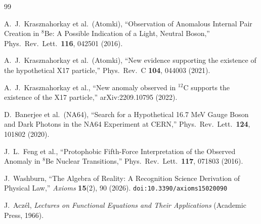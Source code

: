 \documentclass[12pt,a4paper]{article}
\theoremstyle{definition}
\theoremstyle{remark}
\begin{document}
\begin{thebibliography}{99}

A.~J.~Krasznahorkay et al.\ (Atomki),
``Observation of Anomalous Internal Pair Creation in ${}^8$Be:
A Possible Indication of a Light, Neutral Boson,''
Phys.\ Rev.\ Lett.\ \textbf{116}, 042501 (2016).

A.~J.~Krasznahorkay et al.\ (Atomki),
``New evidence supporting the existence of the hypothetical X17
particle,''
Phys.\ Rev.\ C \textbf{104}, 044003 (2021).

A.~J.~Krasznahorkay et al.,
``New anomaly observed in ${}^{12}$C supports the existence of the X17
particle,''
arXiv:2209.10795 (2022).

D.~Banerjee et al.\ (NA64),
``Search for a Hypothetical 16.7 MeV Gauge Boson and Dark Photons in
the NA64 Experiment at CERN,''
Phys.\ Rev.\ Lett.\ \textbf{124}, 101802 (2020).

J.~L.~Feng et al.,
``Protophobic Fifth-Force Interpretation of the Observed Anomaly in
${}^8$Be Nuclear Transitions,''
Phys.\ Rev.\ Lett.\ \textbf{117}, 071803 (2016).

J.~Washburn, ``The Algebra of Reality: A Recognition Science Derivation
of Physical Law,'' \emph{Axioms} \textbf{15}(2), 90 (2026).
\texttt{doi:10.3390/axioms15020090}

J.~Acz\'el, \emph{Lectures on Functional Equations and Their
Applications} (Academic Press, 1966).

\end{thebibliography}
\end{document}
